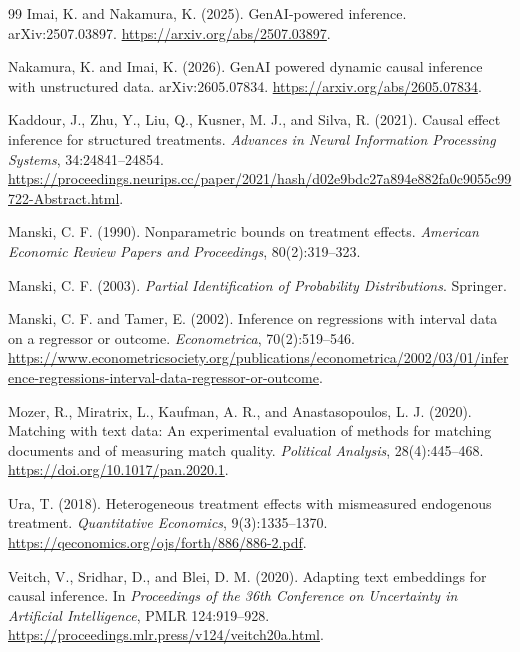 \documentclass[11pt]{article}
\theoremstyle{definition}
\theoremstyle{plain}
\theoremstyle{remark}
\begin{document}
\begin{thebibliography}{99}
Imai, K. and Nakamura, K. (2025).
\newblock GenAI-powered inference.
\newblock arXiv:2507.03897.
\newblock \url{https://arxiv.org/abs/2507.03897}.

Nakamura, K. and Imai, K. (2026).
\newblock GenAI powered dynamic causal inference with unstructured data.
\newblock arXiv:2605.07834.
\newblock \url{https://arxiv.org/abs/2605.07834}.

Kaddour, J., Zhu, Y., Liu, Q., Kusner, M. J., and Silva, R. (2021).
\newblock Causal effect inference for structured treatments.
\newblock \emph{Advances in Neural Information Processing Systems}, 34:24841--24854.
\newblock \url{https://proceedings.neurips.cc/paper/2021/hash/d02e9bdc27a894e882fa0c9055c99722-Abstract.html}.

Manski, C. F. (1990).
\newblock Nonparametric bounds on treatment effects.
\newblock \emph{American Economic Review Papers and Proceedings}, 80(2):319--323.

Manski, C. F. (2003).
\newblock \emph{Partial Identification of Probability Distributions}.
\newblock Springer.

Manski, C. F. and Tamer, E. (2002).
\newblock Inference on regressions with interval data on a regressor or outcome.
\newblock \emph{Econometrica}, 70(2):519--546.
\newblock \url{https://www.econometricsociety.org/publications/econometrica/2002/03/01/inference-regressions-interval-data-regressor-or-outcome}.

Mozer, R., Miratrix, L., Kaufman, A. R., and Anastasopoulos, L. J. (2020).
\newblock Matching with text data: An experimental evaluation of methods for matching documents and of measuring match quality.
\newblock \emph{Political Analysis}, 28(4):445--468.
\newblock \url{https://doi.org/10.1017/pan.2020.1}.

Ura, T. (2018).
\newblock Heterogeneous treatment effects with mismeasured endogenous treatment.
\newblock \emph{Quantitative Economics}, 9(3):1335--1370.
\newblock \url{https://qeconomics.org/ojs/forth/886/886-2.pdf}.

Veitch, V., Sridhar, D., and Blei, D. M. (2020).
\newblock Adapting text embeddings for causal inference.
\newblock In \emph{Proceedings of the 36th Conference on Uncertainty in Artificial Intelligence}, PMLR 124:919--928.
\newblock \url{https://proceedings.mlr.press/v124/veitch20a.html}.
\end{thebibliography}
\end{document}
